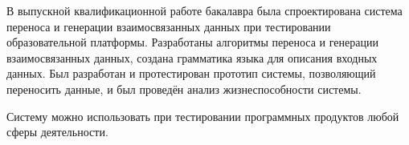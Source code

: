 \abstract %


В выпускной квалификационной работе бакалавра была спроектирована система переноса и генерации взаимосвязанных данных при тестировании образовательной платформы. Разработаны алгоритмы переноса и генерации взаимосвязанных данных, создана грамматика языка для описания входных данных. Был разработан и протестирован прототип системы, позволяющий переносить данные, и был проведён анализ жизнеспособности системы.

Систему можно использовать при тестировании программных продуктов любой сферы деятельности.
